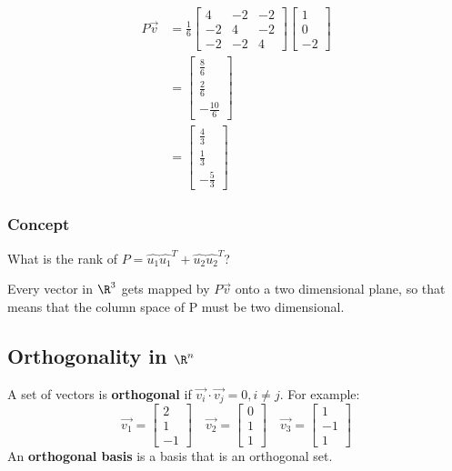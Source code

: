 \documentclass{math}
\begin{document}
\begin{align*}
  P\vec{v} &= \frac{1}{6}\begin{bmatrix}
    4 & -2 & -2 \\
    -2 & 4 & -2 \\
    -2 & -2 & 4
  \end{bmatrix}\begin{bmatrix}1 \\ 0 \\ -2\end{bmatrix} \\
  &= \begin{bmatrix}
    \frac{8}{6} \\ \frac{2}{6} \\ -\frac{10}{6}
  \end{bmatrix} \\
  &= \begin{bmatrix}
    \frac{4}{3} \\ \frac{1}{3} \\ -\frac{5}{3}
  \end{bmatrix}
\end{align*}

\subsubsection*{Concept}
What is the rank of \( P = \hat{u_1}\hat{u_1}^T+\hat{u_2}\hat{u_2}^T \)? \par
Every vector in \( \R^3 \) gets mapped by \( P\vec{v} \) onto a two dimensional
plane, so that means that the column space of P must be two dimensional.

\subsection*{Orthogonality in \( \R^n \)}
A set of vectors is \textbf{orthogonal} if \( \vec{v_i}\cdot\vec{v_j} = 0,
i\ne j \). For example:
\[ \vec{v_1} = \begin{bmatrix}2 \\ 1 \\ -1\end{bmatrix} \quad
  \vec{v_2} = \begin{bmatrix}0 \\ 1 \\ 1\end{bmatrix} \quad
  \vec{v_3} = \begin{bmatrix}1 \\ -1 \\ 1\end{bmatrix} \]
An \textbf{orthogonal basis} is a basis that is an orthogonal set.
\end{document}
